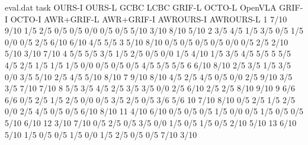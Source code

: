 \begin{filecontents}[overwrite]{eval.dat}
task   OURS-I   OURS-L   GCBC   LCBC   GRIF-L   OCTO-L   OpenVLA   GRIF-I   OCTO-I   AWR+GRIF-L   AWR+GRIF-I    AWROURS-I  AWROURS-L
1      7/10     9/10     1/5    2/5    0/5      0/5      0/0       0/5      0/5      5/10         3/10     8/10     5/10
2      3/5      4/5      1/5    3/5    0/5      1/5      0/0       0/5      2/5      6/10         6/10     4/5      5/5
3      5/10     8/10     0/5    0/5    0/5      0/5      0/0       0/5      2/5      2/10         5/10     3/10     7/10
4      5/5      5/5      3/5    1/5    2/5      0/5      0/0       1/5      4/10     1/5          3/5      4/5      5/5
5      5/5      4/5      2/5    1/5    1/5      1/5      0/0       0/5      0/5      0/5          4/5      5/5      5/5
6      6/10     8/10     2/5    3/5    1/5      3/5      0/0       3/5      5/10     2/5          4/5      5/10     8/10
7      9/10     8/10     4/5    2/5    4/5      0/5      0/0       2/5      9/10     3/5          3/5      7/10     7/10
8      5/5      3/5      4/5    2/5    3/5      3/5      0/0       2/5      6/10     2/5          2/5      8/10     9/10
9      6/6      6/6      0/5    2/5    1/5      2/5      0/0       0/5      3/5      2/5          0/5      3/6      5/6
10     7/10     8/10     0/5    2/5    1/5      2/5      0/0       2/5      4/5      0/5          0/5      6/10     8/10
11     4/10     6/10     0/5    0/5    0/5      1/5      0/0       0/5      1/5      0/5          0/5      5/10     6/10
12     3/10     7/10     0/5    2/5    0/5      3/5      0/0       1/5      0/5      1/5          0/5      2/10     5/10
13     6/10     5/10     1/5    0/5    0/5      1/5      0/0       1/5      2/5      0/5          0/5      7/10     3/10
\end{filecontents}

\eval@data
{}\total@data

\newcount\nextbar
\def\methodbar#1#2{
    \providecommand\style{}
    \advance\nextbar by 1
    \newcount\i
    \expandafter\gdef\csname li@\the\nextbar\endcsname{}
    \pgfplotstablegetrowsof{\total@data}
    \edef\n{\pgfplotsretval}
    { \loop
        \edef\coordindex{\the\i}
        \expanded{\noexpand\pgfplotstablegetelem{\coordindex}{method}}\of\total@data
        \def\target{#1}
        \ifx\pgfplotsretval\target
            \expanded{\noexpand\pgfplotstablegetelem{\coordindex}{mean}}\of\total@data
            \let\avg\pgfplotsretval
            \expanded{\noexpand\pgfplotstablegetelem{\coordindex}{stderr}}\of\total@data
            \expandafter\gdef\csname li@\the\nextbar\endcsname{\nameuse{l@#1}}
            \expanded{\noexpand
                \addplot[fill=#2,\style,pattern color=#2] coordinates {(\avg,\the\nextbar) +- (\pgfplotsretval,0.0)};
            }
        \else
            \advance\i by 1
            \ifnum\i<\n
        \fi
        \repeat
    }
}

